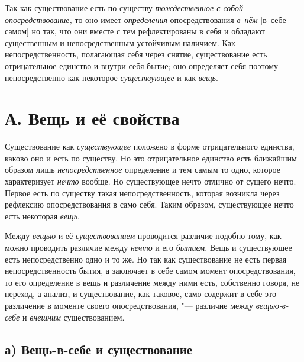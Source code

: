 Так как существование есть по существу
{\em тождественное с собой опосредствование,} то оно
имеет {\em определения} опосредствования
{\em в~нём} [в~себе самом] но так, что они вместе с тем
рефлектированы в себя и обладают существенным и непосредственным устойчивым
наличием. Как непосредственность, полагающая себя через снятие,
существование есть отрицательное единство и внутри-себя-бытие; оно
определяет себя поэтому непосредственно как некоторое
{\em существующее} и как
{\em вещь}.


\section[А. Вещь и её свойства]{А. Вещь и её свойства}

Существование как {\em существующее} положено в форме отрицательного
единства, каково оно и есть по существу. Но это отрицательное единство есть
ближайшим образом лишь {\em непосредственное}
определение и тем самым то одно, которое характеризует
{\em нечто} вообще. Но существующее нечто отлично от
сущего нечто. Первое есть по существу такая непосредственность, которая
возникла через рефлексию опосредствования в само себя. Таким образом,
существующее нечто есть некоторая {\em вещь}.

Между {\em вещью} и её
{\em существованием} проводится различие подобно тому,
как можно проводить различие между {\em нечто} и его
{\em бытием}. Вещь и существующее есть непосредственно
одно и то же. Но так как существование не есть первая непосредственность
бытия, а заключает в себе самом момент опосредствования, то его определение
в вещь и различение между ними есть, собственно говоря, не переход, а
анализ, и существование, как таковое, само содержит в себе это различение в
моменте своего опосредствования, "--- различие между
{\em вещью-в-себе} и {\em внешним} существованием.


\subsection[а) Вещь-в-себе и существование]{а) Вещь-в-себе и существование}

